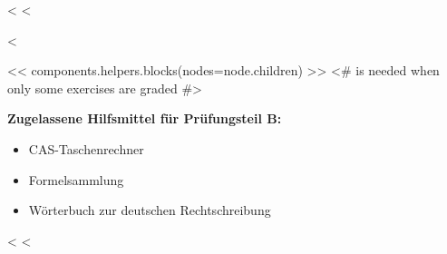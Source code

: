 \documentclass[lang=ngerman]{edoxarticle}
\begin{document}
<%
<%
\begin{exam}<%

<< components.helpers.blocks(nodes=node.children) >>
<# \setpoints is needed when only some exercises are graded #>

\vskip20pt
\textbf{Zugelassene Hilfsmittel für Prüfungsteil B:}
\begin{itemize}
\item CAS-Taschenrechner 
\item Formelsammlung
\item Wörterbuch zur deutschen Rechtschreibung
\end{itemize}

<%
<%
\end{exam}
\end{document}
